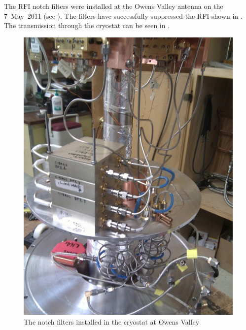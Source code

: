 The RFI notch filters were installed at the Owens Valley antenna on the 7~May~2011 (see ). The filters have successfully suppressed the RFI shown in . The transmission through the cryostat can be seen in .

\begin{figure}
 \centering
 \includegraphics[height=0.6\textheight]{./images/NotchFilter/cryostatInstall.jpg}
 \caption{The notch filters installed in the cryostat at Owens Valley}
 \label{fig:cryostatInstall}
\end{figure}

